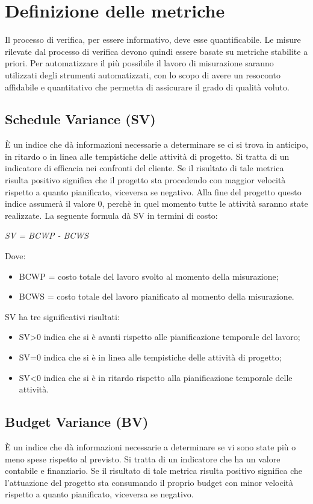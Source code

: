 \section{Definizione delle metriche}

Il processo di verifica, per essere informativo, deve esse quantificabile. Le misure rilevate
dal processo di verifica devono quindi essere basate su metriche stabilite a priori. Per automatizzare il più possibile il lavoro di misurazione saranno utilizzati degli strumenti automatizzati, con lo scopo di avere un resoconto affidabile e quantitativo che permetta di assicurare il grado di qualità voluto.

  \subsection{Schedule Variance (SV)}
  È un indice che dà informazioni necessarie a determinare se ci si trova in anticipo, in ritardo o in linea alle tempistiche delle attività di progetto. Si tratta di un indicatore di efficacia nei confronti del cliente. Se il risultato di tale metrica risulta positivo significa che il progetto sta procedendo con maggior velocità rispetto a quanto pianificato, viceversa
se negativo. Alla fine del progetto questo indice assumerà il valore 0, perchè in quel momento tutte le attività saranno state realizzate.
La seguente formula dà SV in termini di costo:
  \begin{center}
    \emph{SV = BCWP - BCWS}
  \end{center}
  Dove:
  \begin{itemize}
    \item BCWP = costo totale del lavoro svolto al momento della misurazione;
    \item BCWS = costo totale del lavoro pianificato al momento della misurazione.
  \end{itemize}
  SV ha tre significativi risultati:
  \begin{itemize}
    \item SV>0 indica che si è avanti rispetto alle pianificazione temporale del lavoro;
    \item SV=0 indica che si è in linea alle tempistiche delle attività di progetto;
    \item SV<0 indica che si è in ritardo rispetto alla pianificazione temporale delle attività.
  \end{itemize}

  \subsection{Budget Variance (BV)}
  È un indice che dà informazioni necessarie a determinare se vi sono state più o meno spese rispetto al previsto. Si tratta di un indicatore che ha un valore contabile e finanziario. Se il risultato di tale metrica risulta positivo significa che l'attuazione del progetto sta consumando il proprio budget con minor velocità rispetto a quanto pianificato, viceversa se negativo.

